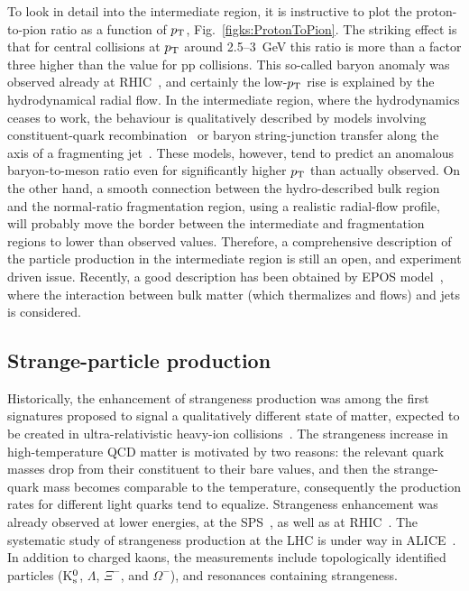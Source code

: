 To look in detail into the intermediate region, it is instructive to plot the proton-to-pion ratio as a function of $p_{\rm T}$, Fig.~\ref{figks:ProtonToPion}. The striking effect is that for central collisions at $p_{\rm T}$ around 2.5--3~GeV this ratio is more than a factor three higher than the value for pp collisions. This so-called baryon anomaly was observed already at RHIC~\cite{Abelev:2006jr,Adare:2013esx}, and certainly the low-$p_{\rm T}$ rise is explained by the hydrodynamical radial flow. In the intermediate region, where the hydrodynamics ceases to work, the behaviour is qualitatively described by models involving constituent-quark recombination~\cite{Fries:2003kq} or baryon string-junction transfer along the axis of a fragmenting jet~\cite{Aurenche:2011rd}. These models, however, tend to predict an anomalous baryon-to-meson ratio even for significantly higher $p_{\rm T}$ than actually observed. On the other hand, a smooth connection between the hydro-described bulk region and the normal-ratio fragmentation region, using a realistic radial-flow profile, will probably move the border between the intermediate and fragmentation regions to lower than observed values. Therefore, a comprehensive description of the particle production in the intermediate region is still an open, and experiment driven issue. Recently, a good description has been obtained
by EPOS model~\cite{Werner:2012xh}, where the interaction between bulk matter (which thermalizes and flows) and jets is considered.

\subsection{Strange-particle production}
\label{subsecks:strangespectra}
Historically, the enhancement of strangeness production was among the first signatures proposed to signal a qualitatively different state of matter, expected to be created in ultra-relativistic heavy-ion collisions~\cite{Rafelski:1982pu,Koch:1986ud}. The strangeness increase in high-temperature QCD matter is motivated by two reasons: the relevant quark masses drop from their constituent to their bare values, and then the strange-quark mass becomes comparable to the temperature, consequently the production rates for different light quarks tend to equalize. Strangeness enhancement was already observed at lower energies, at the SPS~\cite{Margetis:2000sv,Andersen:1999ym,Antinori:2010jm,Alt:2008qm}, as well as at RHIC~\cite{Abelev:2007xp}. The systematic study of strangeness production at the LHC is under way in ALICE~\cite{ABELEV:2013zaa,Abelev:2013xaa}. In addition to charged kaons, the measurements include topologically identified particles (K$_{\rm s}^0$, $\Lambda$, $\Xi^-$, and $\Omega^-$), and resonances containing strangeness.

